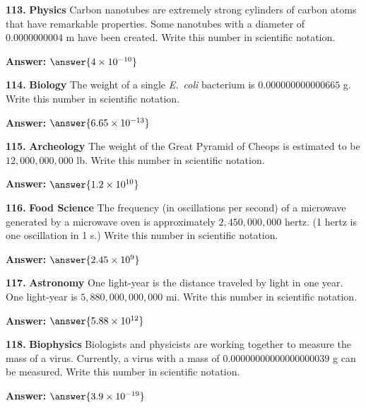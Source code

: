 \documentclass{ximera}
\begin{document}
\begin{problem}
\textbf{113.} \textbf{Physics} Carbon nanotubes are extremely strong cylinders of carbon atoms
  that have remarkable properties. Some nanotubes with a diameter of $0.0000000004$ m have
  been created. Write this number in scientific notation.

\textbf{Answer:} $\answer{4\times 10^{-10}}$
\end{problem}

\begin{problem}
\textbf{114.} \textbf{Biology} The weight of a single \emph{E.~coli} bacterium is
  $0.000000000000665$ g. Write this number in scientific notation.

\textbf{Answer:} $\answer{6.65 \times 10^{-13}}$
\end{problem}

\begin{problem}
\textbf{115.} \textbf{Archeology} The weight of the Great Pyramid of Cheops is estimated to be
  $12{,}000{,}000{,}000$ lb. Write this number in scientific notation.

\textbf{Answer:} $\answer{1.2\times 10^{10}}$
\end{problem}

\begin{problem}
\textbf{116.} \textbf{Food Science} The frequency (in oscillations per second) of a microwave
  generated by a microwave oven is approximately $2{,}450{,}000{,}000$ hertz. (1 hertz is
  one oscillation in 1 s.) Write this number in scientific notation.

\textbf{Answer:} $\answer{2.45 \times 10^{9}}$
\end{problem}

\begin{problem}
\textbf{117.} \textbf{Astronomy} One light-year is the distance traveled by light in one year.
  One light-year is $5{,}880{,}000{,}000{,}000$ mi. Write this number in scientific
  notation.

\textbf{Answer:} $\answer{5.88\times 10^{12}}$
\end{problem}

\begin{problem}
\textbf{118.} \textbf{Biophysics} Biologists and physicists are working together to measure the
  mass of a virus. Currently, a virus with a mass of $0.00000000000000000039$ g can be
  measured. Write this number in scientific notation.

\textbf{Answer:} $\answer{3.9\times 10^{-19}}$
\end{problem}
\end{document}
